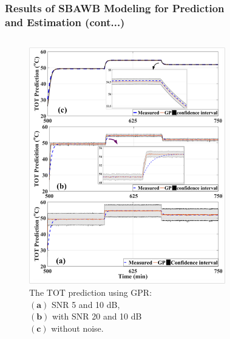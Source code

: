 \documentclass[10pt,hyperref={pdfpagelabels=false}]{beamer}
\begin{document}
\begin{frame}[fragile]
\frametitle{Results of SBAWB Modeling for Prediction\\ and Estimation (cont...)}
\begin{columns}
\begin{figure}
    \centering
    \includegraphics[scale=0.425]{Images/SSN_graphs_CI.png}
    \caption{The TOT prediction using GPR:\\ $(\mathbf{a})$ SNR 5 and 10 dB, \\$(\mathbf{b})$ with SNR 20 and 10 dB\\ $(\mathbf{c})$ without noise.}
    \label{fig:Problem_5_1_1}
\end{figure}
\begin{figure}
    \centering

\end{figure}
\end{columns}
\end{frame}
\end{document}
